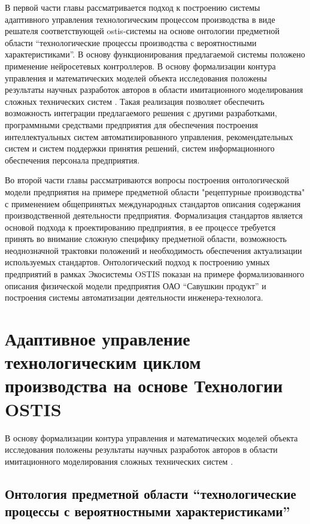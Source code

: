 В первой части главы рассматривается подход к построению системы адаптивного управления технологическим процессом производства в виде решателя соответствующей ostis-системы на основе онтологии предметной области ``технологические процессы производства с вероятностными характеристиками''. В основу функционирования предлагаемой системы положено применение нейросетевых контроллеров. В основу формализации контура управления и математических моделей объекта исследования положены результаты научных разработок авторов в области имитационного моделирования сложных технических систем . Такая реализация позволяет обеспечить возможность интеграции предлагаемого решения с другими разработками, программными средствами предприятия для обеспечения построения интеллектуальных систем автоматизированного управления, рекомендательных систем и систем поддержки принятия решений, систем информационного обеспечения персонала предприятия.

Во второй части главы рассматриваются вопросы построения онтологической модели предприятия на примере предметной области "рецептурные производства" с применением общепринятых международных стандартов описания содержания производственной деятельности предприятия. Формализация стандартов является основой подхода к проектированию предприятия, в ее процессе требуется принять во внимание сложную специфику предметной области, возможность неоднозначной трактовки положений и необходимость обеспечения актуализации используемых стандартов. Онтологический подход к построению умных предприятий в рамках Экосистемы OSTIS показан на примере формализованного описания физической модели предприятия ОАО ``Савушкин продукт'' и построения системы автоматизации деятельности инженера-технолога.

\section{Адаптивное управление технологическим циклом производства на основе Технологии OSTIS}

В основу формализации контура управления и математических моделей объекта исследования положены результаты научных разработок авторов в области имитационного моделирования сложных технических систем .



\subsection{Онтология предметной области ``технологические процессы с вероятностными характеристиками''}

